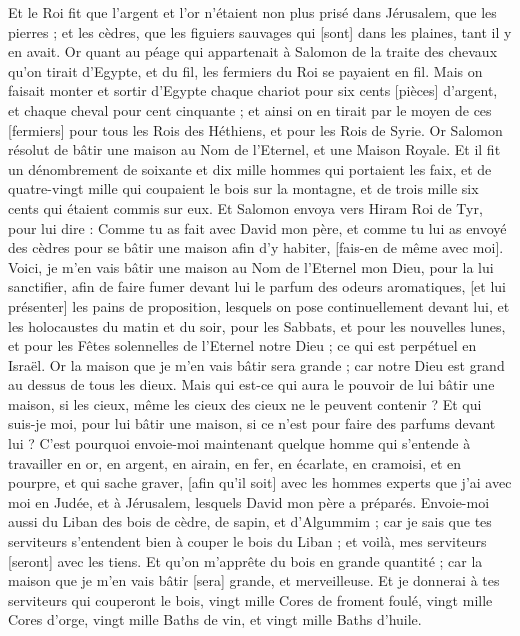 \begin{multicols}{2}
Et le Roi fit que l'argent et l'or n'étaient non plus prisé dans Jérusalem, que les pierres ; et les cèdres, que les figuiers sauvages qui [sont] dans les plaines, tant il y en avait.
Or quant au péage qui appartenait à Salomon de la traite des chevaux qu'on tirait d'Egypte, et du fil, les fermiers du Roi se payaient en fil.
Mais on faisait monter et sortir d'Egypte chaque chariot pour six cents [pièces] d'argent, et chaque cheval pour cent cinquante ; et ainsi on en tirait par le moyen de ces [fermiers] pour tous les Rois des Héthiens, et pour les Rois de Syrie.
\VerseOne{}Or Salomon résolut de bâtir une maison au Nom de l'Eternel, et une Maison Royale.
Et il fit un dénombrement de soixante et dix mille hommes qui portaient les faix, et de quatre-vingt mille qui coupaient le bois sur la montagne, et de trois mille six cents qui étaient commis sur eux.
Et Salomon envoya vers Hiram Roi de Tyr, pour lui dire : Comme tu as fait avec David mon père, et comme tu lui as envoyé des cèdres pour se bâtir une maison afin d'y habiter, [fais-en de même avec moi].
Voici, je m'en vais bâtir une maison au Nom de l'Eternel mon Dieu, pour la lui sanctifier, afin de faire fumer devant lui le parfum des odeurs aromatiques, [et lui présenter] les pains de proposition, lesquels on pose continuellement devant lui, et les holocaustes du matin et du soir, pour les Sabbats, et pour les nouvelles lunes, et pour les Fêtes solennelles de l'Eternel notre Dieu ; ce qui est perpétuel en Israël.
Or la maison que je m'en vais bâtir sera grande ; car notre Dieu est grand au dessus de tous les dieux.
Mais qui est-ce qui aura le pouvoir de lui bâtir une maison, si les cieux, même les cieux des cieux ne le peuvent contenir ? Et qui suis-je moi, pour lui bâtir une maison, si ce n'est pour faire des parfums devant lui ?
C'est pourquoi envoie-moi maintenant quelque homme qui s'entende à travailler en or, en argent, en airain, en fer, en écarlate, en cramoisi, et en pourpre, et qui sache graver, [afin qu'il soit] avec les hommes experts que j'ai avec moi en Judée, et à Jérusalem, lesquels David mon père a préparés.
Envoie-moi aussi du Liban des bois de cèdre, de sapin, et d'Algummim ; car je sais que tes serviteurs s'entendent bien à couper le bois du Liban ; et voilà, mes serviteurs [seront] avec les tiens.
Et qu'on m'apprête du bois en grande quantité ; car la maison que je m'en vais bâtir [sera] grande, et merveilleuse.
Et je donnerai à tes serviteurs qui couperont le bois, vingt mille Cores de froment foulé, vingt mille Cores d'orge, vingt mille Baths de vin, et vingt mille Baths d'huile.

\end{multicols}
